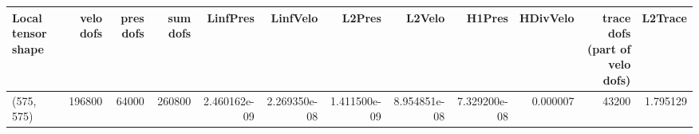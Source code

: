 \begin{tabular}{lrrrrrrrrrrr}
\toprule
Local tensor shape &  velo dofs &  pres dofs &  sum dofs &     LinfPres &     LinfVelo &       L2Pres &       L2Velo &       H1Pres &  HDivVelo &  trace dofs (part of velo dofs) &  L2Trace \\
\midrule
        (575, 575) &     196800 &      64000 &    260800 & 2.460162e-09 & 2.269350e-08 & 1.411500e-09 & 8.954851e-08 & 7.329200e-08 &  0.000007 &                           43200 & 1.795129 \\
\bottomrule
\end{tabular}
